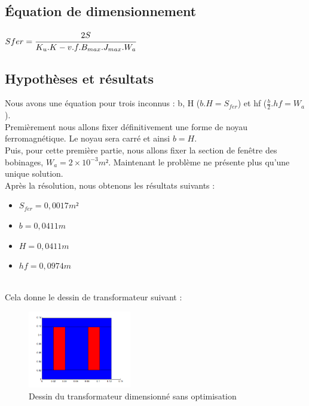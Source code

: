 
\subsection{Équation de dimensionnement}
$ Sfer = \cfrac{2S}{K_u.K-v.f.B_{max}.J_{max}.W_a}$


\subsection{Hypothèses et résultats}
Nous avons une équation pour trois inconnus : b, H ($b.H = S_{fer}$) et hf ($\frac{b}{2}.hf = W_a$).\\
Premièrement nous allons fixer définitivement une forme de noyau ferromagnétique. Le noyau sera carré et ainsi $b = H$.\\
Puis, pour cette première partie, nous allons fixer la section de fenêtre des bobinages, $W_a = 2\times{}10^{-3} m²$.
Maintenant le problème ne présente plus qu'une unique solution.\\

\newpage
Après la résolution, nous obtenons les résultats suivants : \\
\begin{itemize}
\item $S_{fer} = 0,0017 m² $
\item $b = 0,0411 m $
\item $H = 0,0411 m $
\item $hf = 0,0974 m $
\end{itemize}~\\

Cela donne le dessin de transformateur suivant :
\begin{figure}[h]
	\begin{center}
	\includegraphics[width=0.4\textwidth]{images/TP1_transfo_carre}
	\caption{Dessin du transformateur dimensionné sans optimisation}\label{img:dessinTransfoCarre}
	\end{center}
\end{figure}
\FloatBarrier 

